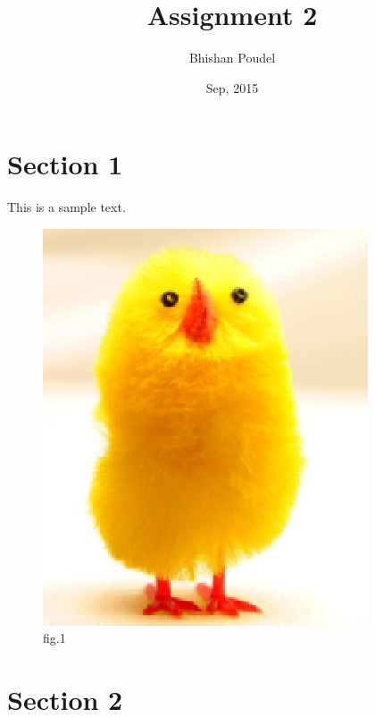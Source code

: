 \documentclass[14pt]{article}
\title{Assignment 2}
\author{Bhishan Poudel}
\date{Sep, 2015}
\begin{document}
\maketitle



\section{Section 1}
This is a sample text.
\clearpage



\begin{figure}[ht!]
\centering
\includegraphics[scale=0.7]{chick}
\caption{fig.1}
\end{figure}



\section{Section 2}

\setlength{\unitlength}{0.8cm}
\end{document}
